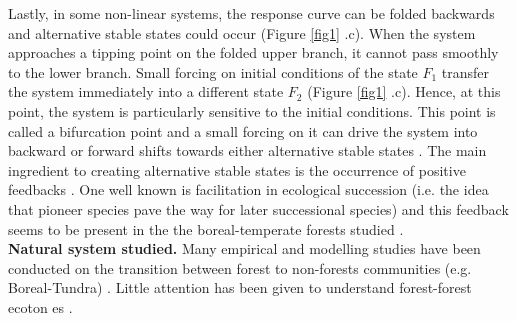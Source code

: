 Lastly, in some non-linear systems, the response curve can be folded backwards
and alternative stable states could occur (Figure \ref{fig1} .c). When the
system approaches a tipping point on the folded upper branch, it cannot pass
smoothly to the lower branch. Small forcing on initial conditions of the state
$F_1$ transfer the system immediately into a different state $F_2$ (Figure
\ref{fig1} .c). Hence, at this point, the system is particularly sensitive to
the initial conditions. This point is called a bifurcation point and a small
forcing on it can drive the system into backward or forward shifts towards
either alternative stable states \cite{scheffer2009critical}. The main
ingredient to creating alternative stable states is the occurrence of positive
feedbacks \cite{scheffer2009critical,Schroder2005}. One well known is
facilitation in ecological succession (i.e. the idea that pioneer species pave
the way for later successional species) and this feedback seems to be present
in the the boreal-temperate forests studied \cite{Barras1998,Society2014}. \\


\textbf{Natural system studied.} Many empirical and modelling studies have been
conducted on the transition between forest to non-forests communities (e.g. Boreal-Tundra) 
\cite{Scheffer2012,Scheffer2001,Hirota2011,Messaoud2007}. Little
attention has been given to understand forest-forest ecoton es
\cite{Goldblum2010,Graignic2013,Messaoud2007}. 



